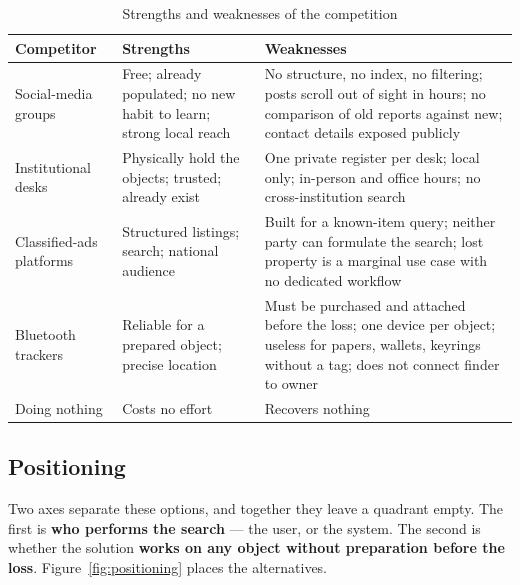 \begin{table}[htbp]
\centering
\caption{Strengths and weaknesses of the competition}
\label{tab:competitors}
\small
\begin{tabularx}{\textwidth}{@{}p{3.1cm} X X@{}}
\toprule
\textbf{Competitor} & \textbf{Strengths} & \textbf{Weaknesses} \\
\midrule
Social-media groups
  & Free; already populated; no new habit to learn; strong local reach
  & No structure, no index, no filtering; posts scroll out of sight in hours;
    no comparison of old reports against new; contact details exposed publicly \\
\addlinespace
Institutional desks
  & Physically hold the objects; trusted; already exist
  & One private register per desk; local only; in-person and office hours;
    no cross-institution search \\
\addlinespace
Classified-ads platforms
  & Structured listings; search; national audience
  & Built for a known-item query; neither party can formulate the search;
    lost property is a marginal use case with no dedicated workflow \\
\addlinespace
Bluetooth trackers
  & Reliable for a prepared object; precise location
  & Must be purchased and attached before the loss; one device per object;
    useless for papers, wallets, keyrings without a tag; does not connect
    finder to owner \\
\addlinespace
Doing nothing
  & Costs no effort
  & Recovers nothing \\
\bottomrule
\end{tabularx}
\end{table}

\subsection{Positioning}

Two axes separate these options, and together they leave a quadrant empty.
The first is \textbf{who performs the search} --- the user, or the system. The
second is whether the solution \textbf{works on any object without preparation
before the loss}. Figure~\ref{fig:positioning} places the alternatives.

